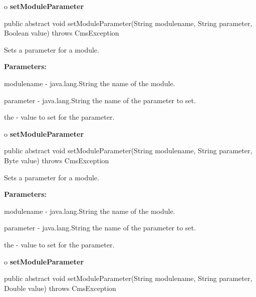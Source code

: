 o {\bf setModuleParameter} 

\begin{PRE}
 public abstract void setModuleParameter(String modulename,
                                         String parameter,
                                         Boolean value) throws CmsException
\end{PRE}

\begin{description}
\htmlDD Sets a parameter for a module. 

\begin{description}
\item {\bf Parameters:}  

modulename - java.lang.String the name of the module.  

parameter - java.lang.String the name of the parameter to set.  

the - value to set for the parameter.  
\end{description}

\end{description}

o {\bf setModuleParameter} 

\begin{PRE}
 public abstract void setModuleParameter(String modulename,
                                         String parameter,
                                         Byte value) throws CmsException
\end{PRE}

\begin{description}
\htmlDD Sets a parameter for a module. 

\begin{description}
\item {\bf Parameters:}  

modulename - java.lang.String the name of the module.  

parameter - java.lang.String the name of the parameter to set.  

the - value to set for the parameter.  
\end{description}

\end{description}

o {\bf setModuleParameter} 

\begin{PRE}
 public abstract void setModuleParameter(String modulename,
                                         String parameter,
                                         Double value) throws CmsException
\end{PRE}

